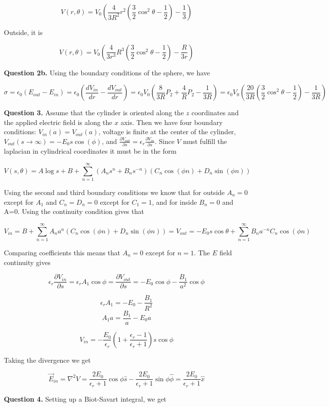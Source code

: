 \documentclass[letterpaper, reqno,11pt]{article}
\newcommand{\ep}{\epsilon}
\begin{document}
\[
    V(r, \theta) = V_0(\frac4{3R^2}r^2(\frac32\cos^2\theta-\frac12)-\frac13)
\]

Outside, it is 

\[
    V(r, \theta) = V_0(\frac4{3r^3}R^3(\frac32\cos^2\theta-\frac12)-\frac R{3r})
\]

{\noindent\bf Question 2b.} Using the boundary conditions of the sphere, we have 

\[
    \sigma=\epsilon_0(E_{out}-E_{in})=\epsilon_0(\frac{dV_{in}}{dr}-\frac{dV_{out}}{dr})=\ep_0V_0(\frac8{3R}P_2+\frac4{R}P_2-\frac1{3R})=\ep_0V_0(\frac{20}{3R}(\frac32\cos^2\theta-\frac12)-\frac1{3R})
\]

{\noindent\bf Question 3.} Assume that the cylinder is oriented along the $z$ coordinates and the applied electric field is along the $x$ axis. Then we have four boundary conditions: $V_{in}(a)=V_{out}(a)$, voltage is finite at the center of the cylinder, $V_{out}(s\to\infty)=-E_0s\cos(\phi)$, and $\frac{\partial V_{out}}{\partial s}=\epsilon_r\frac{\partial V_{in}}{\partial s}$. Since $V$ must fulfill the laplacian in cylindrical coordinates it must be in the form 

\[
    V(s, \theta)=A\log s+B+\sum_{n=1}^\infty (A_ns^n+B_ns^{-n})(C_n\cos(\phi n)+D_n\sin(\phi n))
\]

Using the second and third boundary conditions we know that for outside $A_n=0$ except for $A_1$ and $C_n=D_n=0$ except for $C_1=1$, and for inside $B_n=0$ and A=0. Using the continuity condition gives that 

\[
    V_{in}=B+\sum_{n=1}^\infty A_na^n(C_n\cos(\phi n)+D_n\sin(\phi n))=V_{out}=-E_0s\cos\theta+\sum_{n=1}^\infty B_n a^{-n}C_n\cos(\phi n)
\]

Comparing coefficients this means that $A_n=0$ except for $n=1$. The $E$ field continuity gives 

\[
    \ep_r\frac{\partial V_{in}}{\partial s}=\ep_r A_1\cos\phi=\frac{\partial V_{out}}{\partial s}=-E_0\cos\phi-\frac{B_1}{a^2}\cos\phi
\]

\[
    \ep_r A_1=-E_0-\frac{B_1}{R^2}
\]
\[
    A_1a=\frac{B_1}{a}-E_0 a
\]

\[
    V_{in}=-\frac{E_0}{\ep_r}(1+\frac{\ep_r-1}{\ep_r+1})s\cos\phi
\]

Taking the divergence we get 

\[
    \vec E_{in}=\nabla^2 V=\frac{2E_0}{\ep_r+1}\cos\phi\hat s-\frac{2E_0}{\ep_r+1}\sin\phi\hat\phi=\frac{2E_0}{\ep_r+1}\hat x
\]

{\noindent\bf Question 4.} Setting up a Biot-Savart integral, we get 
\end{document}
